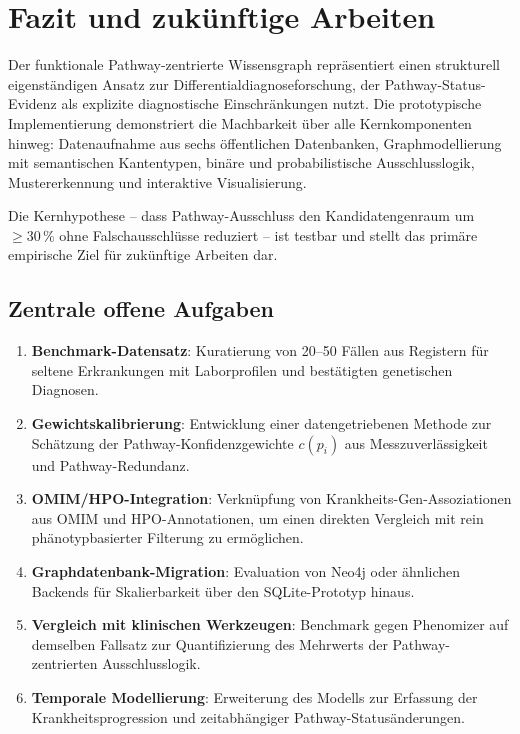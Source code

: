 \documentclass[12pt,a4paper]{article}
\begin{document}
\section{Fazit und zukünftige Arbeiten}
\label{sec:conclusion}

Der funktionale Pathway-zentrierte Wissensgraph repräsentiert einen strukturell eigenständigen Ansatz zur Differentialdiagnoseforschung, der Pathway-Status-Evidenz als explizite diagnostische Einschränkungen nutzt. Die prototypische Implementierung demonstriert die Machbarkeit über alle Kernkomponenten hinweg: Datenaufnahme aus sechs öffentlichen Datenbanken, Graphmodellierung mit semantischen Kantentypen, binäre und probabilistische Ausschlusslogik, Mustererkennung und interaktive Visualisierung.

Die Kernhypothese -- dass Pathway-Ausschluss den Kandidatengenraum um $\geq 30\,\%$ ohne Falschausschlüsse reduziert -- ist testbar und stellt das primäre empirische Ziel für zukünftige Arbeiten dar.

\subsection{Zentrale offene Aufgaben}

\begin{enumerate}
    \item \textbf{Benchmark-Datensatz}: Kuratierung von 20--50 Fällen aus Registern für seltene Erkrankungen mit Laborprofilen und bestätigten genetischen Diagnosen.
    \item \textbf{Gewichtskalibrierung}: Entwicklung einer datengetriebenen Methode zur Schätzung der Pathway-Konfidenzgewichte $c(p_i)$ aus Messzuverlässigkeit und Pathway-Redundanz.
    \item \textbf{OMIM/HPO-Integration}: Verknüpfung von Krankheits-Gen-Assoziationen aus OMIM und HPO-Annotationen, um einen direkten Vergleich mit rein phänotypbasierter Filterung zu ermöglichen.
    \item \textbf{Graphdatenbank-Migration}: Evaluation von Neo4j oder ähnlichen Backends für Skalierbarkeit über den SQLite-Prototyp hinaus.
    \item \textbf{Vergleich mit klinischen Werkzeugen}: Benchmark gegen Phenomizer auf demselben Fallsatz zur Quantifizierung des Mehrwerts der Pathway-zentrierten Ausschlusslogik.
    \item \textbf{Temporale Modellierung}: Erweiterung des Modells zur Erfassung der Krankheitsprogression und zeitabhängiger Pathway-Statusänderungen.
\end{enumerate}
\end{document}

